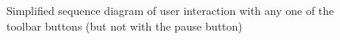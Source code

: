 \documentclass[a4paper]{article}
\begin{document}
\begin{figure}[ht]
  \centering
  \caption{Simplified sequence diagram of user interaction with any one of the toolbar buttons (but not with the pause button)}
  \label{fig:sd_server_userinteraction}
\end{figure}

\end{document}

